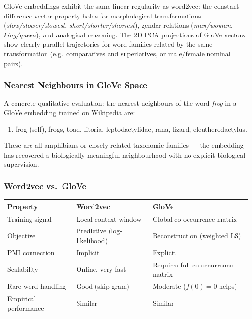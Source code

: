 \documentclass[11pt,a4paper]{article}
\begin{document}
GloVe embeddings exhibit the same linear regularity as word2vec: the constant-difference-vector property holds for morphological transformations (\textit{slow/slower/slowest}, \textit{short/shorter/shortest}), gender relations (\textit{man/woman}, \textit{king/queen}), and analogical reasoning. The 2D PCA projections of GloVe vectors show clearly parallel trajectories for word families related by the same transformation (e.g.\ comparatives and superlatives, or male/female nominal pairs).

\subsubsection{Nearest Neighbours in GloVe Space}

A concrete qualitative evaluation: the nearest neighbours of the word \textit{frog} in a GloVe embedding trained on Wikipedia are:
\begin{enumerate}
  \item frog (self), frogs, toad, litoria, leptodactylidae, rana, lizard, eleutherodactylus.
\end{enumerate}
These are all amphibians or closely related taxonomic families — the embedding has recovered a biologically meaningful neighbourhood with no explicit biological supervision.

\subsubsection{Word2vec vs.\ GloVe}

\begin{center}
\renewcommand{\arraystretch}{1.25}
\begin{tabular}{lll}
\toprule
\textbf{Property} & \textbf{Word2vec} & \textbf{GloVe} \\
\midrule
Training signal & Local context window & Global co-occurrence matrix \\
Objective & Predictive (log-likelihood) & Reconstruction (weighted LS) \\
PMI connection & Implicit & Explicit \\
Scalability & Online, very fast & Requires full co-occurrence matrix \\
Rare word handling & Good (skip-gram) & Moderate ($f(0)=0$ helps) \\
Empirical performance & Similar & Similar \\
\bottomrule
\end{tabular}
\end{center}
\end{document}
